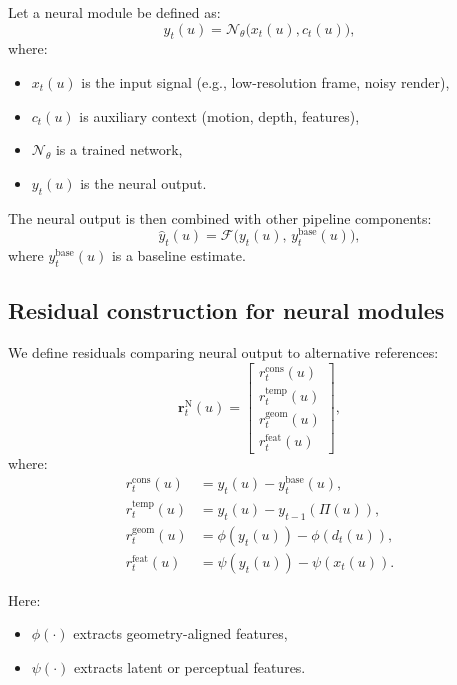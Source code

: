 \documentclass[11pt,letterpaper]{article}
\theoremstyle{gcresult}
\theoremstyle{definition}
\begin{document}
Let a neural module be defined as:
\begin{equation}
y_t(u) = \mathcal{N}_\theta\bigl(x_t(u), c_t(u)\bigr),
\end{equation}
where:
\begin{itemize}[leftmargin=1.5em]
    \item $x_t(u)$ is the input signal (e.g., low-resolution frame, noisy render),
    \item $c_t(u)$ is auxiliary context (motion, depth, features),
    \item $\mathcal{N}_\theta$ is a trained network,
    \item $y_t(u)$ is the neural output.
\end{itemize}

The neural output is then combined with other pipeline components:
\begin{equation}
\hat{y}_t(u)=\mathcal{F}\bigl(y_t(u),\,y^{\mathrm{base}}_t(u)\bigr),
\end{equation}
where $y^{\mathrm{base}}_t(u)$ is a baseline estimate.


\subsection{Residual construction for neural modules}

We define residuals comparing neural output to alternative references:
\begin{equation}
\mathbf r^{\mathrm{N}}_t(u)=
\begin{bmatrix}
r^{\mathrm{cons}}_t(u)\\
r^{\mathrm{temp}}_t(u)\\
r^{\mathrm{geom}}_t(u)\\
r^{\mathrm{feat}}_t(u)
\end{bmatrix},
\end{equation}
where:
\begin{align}
r^{\mathrm{cons}}_t(u) &= y_t(u) - y^{\mathrm{base}}_t(u),\\
r^{\mathrm{temp}}_t(u) &= y_t(u) - y_{t-1}(\Pi(u)),\\
r^{\mathrm{geom}}_t(u) &= \phi(y_t(u)) - \phi(d_t(u)),\\
r^{\mathrm{feat}}_t(u) &= \psi(y_t(u)) - \psi(x_t(u)).
\end{align}

Here:
\begin{itemize}[leftmargin=1.5em]
    \item $\phi(\cdot)$ extracts geometry-aligned features,
    \item $\psi(\cdot)$ extracts latent or perceptual features.
\end{itemize}
\end{document}
